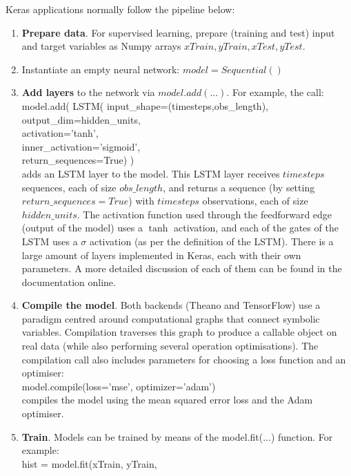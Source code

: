 \documentclass[pdftex,11pt,a4paper]{article}
\theoremstyle{definition}
\theoremstyle{remark}
\newcommand\tab[1][1cm]{\hspace*{#1}}
\begin{document}
\par Keras applications normally follow the pipeline below:
\begin{enumerate}
    \item \textbf{Prepare data}. For supervised learning, prepare (training and test) input and target variables as Numpy arrays $xTrain, yTrain, xTest, yTest$.
    \item Instantiate an empty neural network: $model = Sequential()$
    \item \textbf{Add layers} to the network via $model.add(...)$. For example, the call:\\
        model.add( LSTM( input\_shape=(timesteps,obs\_length), \\
                    \tab output\_dim=hidden\_units, \\
                    \tab activation='tanh', \\
                    \tab inner\_activation='sigmoid', \\
                    \tab return\_sequences=True) )\\
        adds an LSTM layer to the model. This LSTM layer receives $timesteps$ sequences, each of size $obs\_length$, and returns a sequence (by setting $return\_sequences=True$) with $timesteps$ observations, each of size $hidden\_units$. The activation function used through the feedforward edge (output of the model) uses a $\tanh$ activation, and each of the gates of the LSTM uses a $\sigma$ activation (as per the definition of the LSTM). There is a large amount of layers implemented in Keras, each with their own parameters. A more detailed discussion of each of them can be found in the documentation online.
    \item \textbf{Compile the model}. Both backends (Theano and TensorFlow) use a paradigm centred around computational graphs that connect symbolic variables. Compilation traverses this graph to produce a callable object on real data (while also performing several operation optimisations). The compilation call also includes parameters for choosing a loss function and an optimiser:\\
    model.compile(loss='mse', optimizer='adam')\\
    compiles the model using the mean squared error loss and the Adam optimiser.
    \item \textbf{Train}. Models can be trained by means of the model.fit(...) function. For example:\\
    hist = model.fit(xTrain, yTrain, \\

\end{enumerate}
\end{document}
